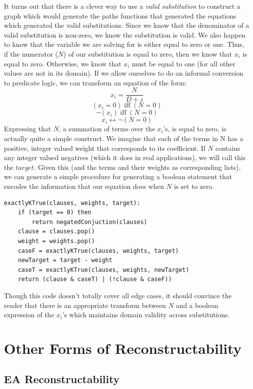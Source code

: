 \documentclass[11pt,a4paper]{report}
\begin{document}
It turns out that there is a clever way to use a \emph{valid substitution} to construct a graph which would generate the paths functions that generated the equations which generated the valid substitutions.
Since we know that the denominator of a valid substitution is non-zero, we know the substitution is valid.  
We also happen to know that the variable we are solving for is either equal to zero or one.  
Thus, if the numerator ($N$) of our substitution is equal to zero, then we know that $x_i$ is equal to zero.  
Otherwise, we know that $x_i$ must be equal to one (for all other values are not in its domain). 
If we allow ourselves to do an informal conversion to predicate logic, we can transform an equation of the form:
 $$x_i = \frac{N}{D + z}$$ 
 $$(x_i = 0) \; \text{iff} \; (N = 0)$$
 $$\neg(x_i) \; \text{iff} \; (N = 0)$$
 $$x_i  \leftrightarrow  \neg(N = 0)$$
Expressing that $N$, a summation of terms over the $x_i$'s, is equal to zero, is actually quite a simple construct. 
We imagine that each of the terms in N has a positive, integer valued weight that corresponds to its coefficient. 
If $N$ contains any integer valued negatives (which it does in real applications), we will call this the $target$.
Given this (and the terms and their weights as corresponding lists), we can generate a simple procedure for generating a boolean statement that encodes the information that our equation does when $N$ is set to zero.

\begin{lstlisting}[frame=single]
exactlyKTrue(clauses, weights, target):
	if (target == 0) then
		return negatedConjuction(clauses)
	clause = clauses.pop()
	weight = weights.pop()
	caseF = exactlyKTrue(clauses, weights, target)
	newTarget = target - weight
	caseT = exactlyKTrue(clauses, weights, newTarget)
	return (clause & caseT) | (!clause & caseF))
\end{lstlisting}

Though this code doesn't totally cover all edge cases, it should convince the reader that there is an appropriate transform between $N$ and a boolean expression of the $x_i$'s which maintains domain validity across substitutions.

\section{Other Forms of Reconstructability}
\subsection{EA Reconstructability}
\end{document}
